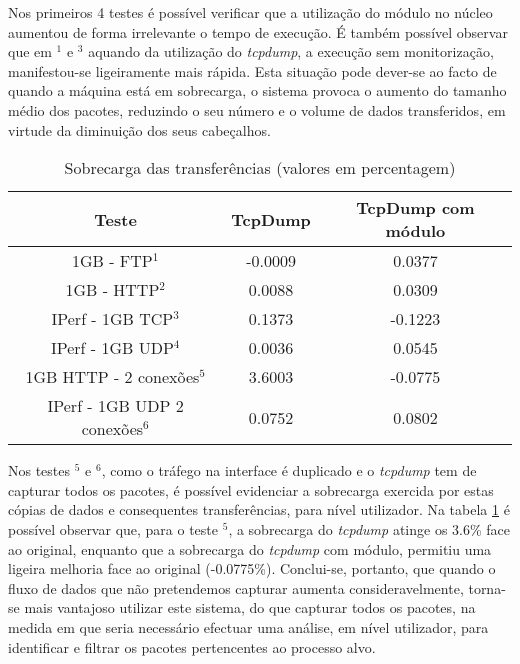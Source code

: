 Nos primeiros 4 testes é possível verificar que a utilização do módulo no núcleo aumentou de forma irrelevante o tempo de execução.
É também possível observar que em $^{1}$ e $^{3}$ aquando da utilização do \textit{tcpdump}, a execução sem monitorização, manifestou-se ligeiramente mais rápida.
Esta situação pode dever-se ao facto de quando a máquina está em sobrecarga, o sistema provoca o aumento do tamanho médio dos pacotes, reduzindo o seu número e o volume de dados transferidos, em virtude da diminuição dos seus cabeçalhos.

\begin{table}
\begin{center}
\caption{Sobrecarga das transferências (valores em percentagem)}
\begin{tabular}{ | c | c | c |}
\hline
Teste & \hspace {0.3cm} TcpDump \hspace {0.3cm} & TcpDump com módulo  \\

\hline
1GB - FTP$^{1}$ & -0.0009  & 0.0377  \\
1GB - HTTP$^{2}$ & 0.0088 &  0.0309   \\
IPerf - 1GB TCP$^{3}$ & 0.1373 &  -0.1223   \\
IPerf - 1GB UDP$^{4}$ & 0.0036 & 0.0545 \\
\hline
\hline
1GB HTTP - 2 conexões$^{5}$ & 3.6003 & -0.0775   \\
IPerf - 1GB UDP 2 conexões$^{6}$ & 0.0752 & 0.0802   \\
\hline
\end{tabular}
\label{tab:overhead}
\end{center}
\end{table}

Nos testes $^{5}$ e $^{6}$, como o tráfego na interface é duplicado e o \textit{tcpdump} tem de capturar todos os pacotes, é possível evidenciar a sobrecarga exercida por estas cópias de dados e consequentes transferências, para nível utilizador.
Na tabela \ref{tab:overhead} é possível observar que, para o teste $^{5}$, a sobrecarga do \textit{tcpdump} atinge os 3.6\% face ao original, enquanto que a sobrecarga do \textit{tcpdump} com módulo, permitiu uma ligeira melhoria face ao original (-0.0775\%).
Conclui-se, portanto, que quando o fluxo de dados que não pretendemos capturar aumenta consideravelmente, torna-se mais vantajoso utilizar este sistema, do que capturar todos os pacotes, na medida em que seria necessário efectuar uma análise, em nível utilizador, para identificar e filtrar os pacotes pertencentes ao processo alvo.

